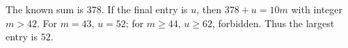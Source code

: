 The known sum is $378$. If the final entry is $u$, then $378+u=10m$ with integer $m>42$. For $m=43$, $u=52$; for $m\ge44$, $u\ge62$, forbidden. Thus the largest entry is $\boxed{52}$.
